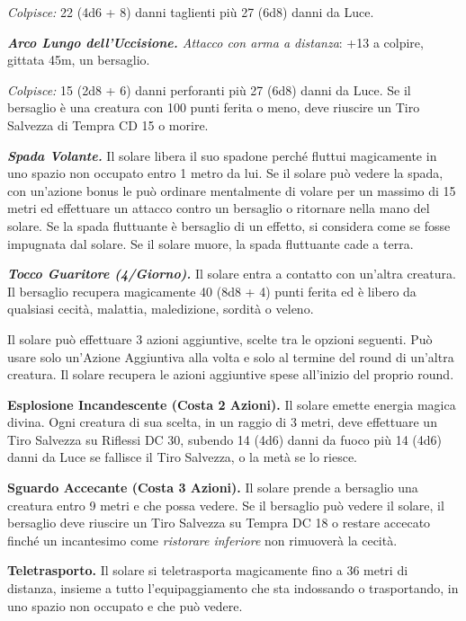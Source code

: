 \begin{multicols}{2}
\emph{Colpisce:} 22 (4d6 + 8) danni taglienti più 27 (6d8) danni da Luce.

\emph{\textbf{Arco Lungo dell'Uccisione.} Attacco con arma a distanza}: +13 a colpire, gittata 45m, un bersaglio.

\emph{Colpisce:} 15 (2d8 + 6) danni perforanti più 27 (6d8) danni da Luce. Se il bersaglio è una creatura con 100 punti ferita o meno, deve riuscire un Tiro Salvezza di Tempra CD 15 o morire.

\emph{\textbf{Spada Volante.}} Il solare libera il suo spadone perché fluttui magicamente in uno spazio non occupato entro 1 metro da lui.  Se il solare può vedere la spada, con un'azione bonus le può ordinare mentalmente di volare per un massimo di 15 metri ed effettuare un attacco contro un bersaglio o ritornare nella mano del solare. Se la spada fluttuante è bersaglio di un effetto, si considera come se fosse impugnata dal solare. Se il solare muore, la spada fluttuante cade a terra.

\emph{\textbf{Tocco Guaritore (4/Giorno).}} Il solare entra a contatto con un'altra creatura. Il bersaglio recupera magicamente 40 (8d8 + 4) punti ferita ed è libero da qualsiasi cecità, malattia, maledizione, sordità o veleno.

Il solare può effettuare 3 azioni aggiuntive, scelte tra le opzioni seguenti. Può usare solo un'Azione Aggiuntiva alla volta e solo al termine del round di un'altra creatura. Il solare recupera le azioni aggiuntive spese all'inizio del proprio round. 

\textbf{Esplosione Incandescente (Costa 2 Azioni).} Il solare emette energia magica divina. Ogni creatura di sua scelta, in un raggio di 3 metri, deve effettuare un Tiro Salvezza su Riflessi DC  30, subendo 14 (4d6) danni da fuoco più 14 (4d6) danni da Luce se fallisce il Tiro Salvezza, o la metà se lo riesce. 

\textbf{Sguardo Accecante (Costa 3 Azioni).} Il solare prende a bersaglio una creatura entro 9 metri e che possa vedere. Se il bersaglio può vedere il solare, il bersaglio deve riuscire un Tiro Salvezza su Tempra DC  18 o restare accecato finché un incantesimo come \emph{ristorare inferiore} non rimuoverà la cecità.

\textbf{Teletrasporto.} Il solare si teletrasporta magicamente fino a 36 metri di distanza, insieme a tutto l'equipaggiamento che sta indossando o trasportando, in uno spazio non occupato e che può vedere.


\end{multicols}
